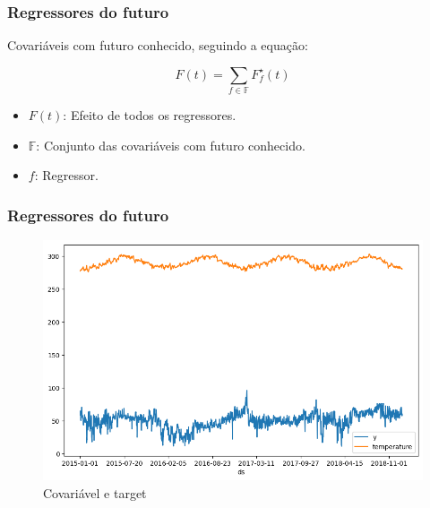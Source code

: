 \documentclass{beamer}
\begin{document}
\begin{frame}
\frametitle{Regressores do futuro}
Covariáveis com futuro conhecido, seguindo a equação:

\begin{equation}
    F(t) = \sum_{f \in \mathbb{F}} F_f^\star(t)
\end{equation}
\begin{itemize}
    \item $F(t)$: Efeito de todos os regressores.
    \item $\mathbb{F}$: Conjunto das covariáveis com futuro conhecido.
    \item $f$: Regressor.
\end{itemize}
\end{frame}


\begin{frame}
\frametitle{Regressores do futuro}
\begin{figure}
    \centering
    \includegraphics[width=0.7\linewidth]{regressores-futuro.png}
    \caption{Covariável e target}
\end{figure}
\end{frame}


\section*{}
\setcounter{section}{0}
\end{document}
